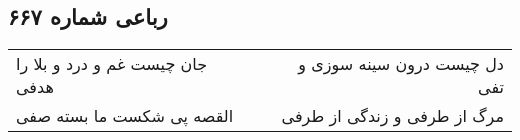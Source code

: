\begin{center}
\section*{رباعی شماره ۶۶۷}
\label{sec:sh667}
\begin{longtable}{l p{0.5cm} r}
جان چیست غم و درد و بلا را هدفی
&&
دل چیست درون سینه سوزی و تفی
\\
القصه پی شکست ما بسته صفی
&&
مرگ از طرفی و زندگی از طرفی
\\
\end{longtable}
\end{center}
